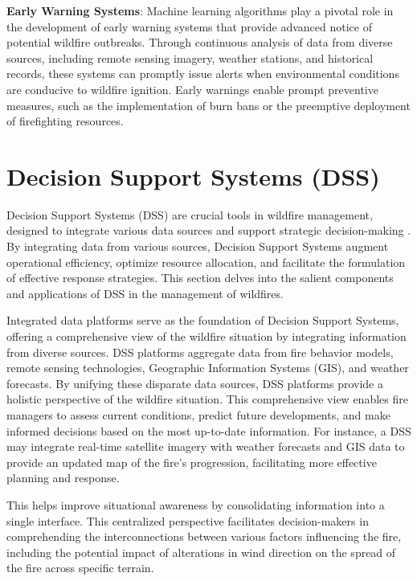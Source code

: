 \documentclass[
  12 pt,
]{Nemilov}
\begin{document}
\textbf{Early Warning Systems}: Machine learning algorithms play a pivotal role in the development of early warning systems that provide advanced notice of potential wildfire outbreaks. Through continuous analysis of data from diverse sources, including remote sensing imagery, weather stations, and historical records, these systems can promptly issue alerts when environmental conditions are conducive to wildfire ignition. Early warnings enable prompt preventive measures, such as the implementation of burn bans or the preemptive deployment of firefighting resources.

\section{Decision Support Systems (DSS)}\label{decision-support-systems-dss}

Decision Support Systems (DSS) are crucial tools in wildfire management, designed to integrate various data sources and support strategic decision-making \citep{martell2015review}. By integrating data from various sources, Decision Support Systems augment operational efficiency, optimize resource allocation, and facilitate the formulation of effective response strategies. This section delves into the salient components and applications of DSS in the management of wildfires.

Integrated data platforms serve as the foundation of Decision Support Systems, offering a comprehensive view of the wildfire situation by integrating information from diverse sources. DSS platforms aggregate data from fire behavior models, remote sensing technologies, Geographic Information Systems (GIS), and weather forecasts. By unifying these disparate data sources, DSS platforms provide a holistic perspective of the wildfire situation. This comprehensive view enables fire managers to assess current conditions, predict future developments, and make informed decisions based on the most up-to-date information. For instance, a DSS may integrate real-time satellite imagery with weather forecasts and GIS data to provide an updated map of the fire's progression, facilitating more effective planning and response.

This helps improve situational awareness by consolidating information into a single interface. This centralized perspective facilitates decision-makers in comprehending the interconnections between various factors influencing the fire, including the potential impact of alterations in wind direction on the spread of the fire across specific terrain.
\end{document}
